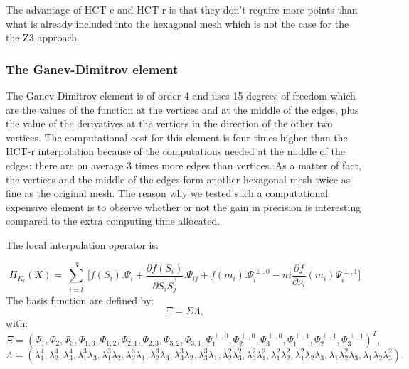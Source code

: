 \documentclass[proc]{edpsmath}
\begin{document}
The advantage of HCT-c and HCT-r is that they don't require more points than what is already included into the hexagonal mesh which is not the case for the the Z3 approach.

\subsubsection{The Ganev-Dimitrov element}
\label{subsubsec:ganevdimitrov}
The Ganev-Dimitrov element is of order 4 and uses 15 degrees of freedom which are the values of the function at the vertices and at the middle of the edges, plus the value of the derivatives at the vertices in the direction of the other two vertices. 
The computational cost for this element is four times higher than the HCT-r interpolation because of the computations needed at the middle of the edges: there are on average 3 times more edges than vertices. As a matter of fact, the vertices and the middle of the edges form another hexagonal mesh twice as fine as the original mesh. The reason why we tested such a computational expensive element is to observe whether or not the gain in precision is interesting compared to the extra computing time allocated. 

\noindent The local interpolation operator is:

\begin{equation*}
 \Pi_{K_l} (X) = \sum \limits_{\substack{i=l }}^{3}{ [f(S_i).\Psi_i +  \frac{\partial f(S_i)}{\partial  \overrightarrow{ S_i S_j } }.\Psi_{ij} } + f(m_i).\Psi^{\perp,0}_i  - ni \frac{\partial f}{\partial \nu_i}(m_i) \Psi^{\perp,1}_i] 
\end{equation*}
\noindent The basis function are defined by: 
\begin{equation*}
\Xi =  \Sigma \Lambda,
\end{equation*} 
 \noindent with:\\
\begin{equation*}
\Xi=(\Psi_1, \Psi_2, \Psi_3, \Psi_{1,3},\Psi_{1,2},\Psi_{2,1},\Psi_{2,3} ,\Psi_{3,2},\Psi_{3,1},\Psi_1^{\perp,0} ,\Psi_2^{\perp,0},\Psi_3^{\perp,0},\Psi_1^{\perp,1},\Psi_2^{\perp,1},\Psi_3^{\perp,1})^T,
\end{equation*} 
\begin{equation*}
\Lambda = ( \lambda_1^4,\lambda_2^4,\lambda_3^4,\lambda_1^3\lambda_3,\lambda_1^3\lambda_2,\lambda_2^3\lambda_1,\lambda_2^3\lambda_3 ,\lambda_3^3\lambda_2,\lambda_3^3\lambda_1,\lambda_2^2\lambda_3^2,\lambda_3^2\lambda_1^2,\lambda_1^2\lambda_2^2,\lambda_1^2\lambda_2\lambda_3,\lambda_1\lambda_2^2\lambda_3,\lambda_1\lambda_2\lambda_3^2).
\end{equation*} 
  
\end{document}

